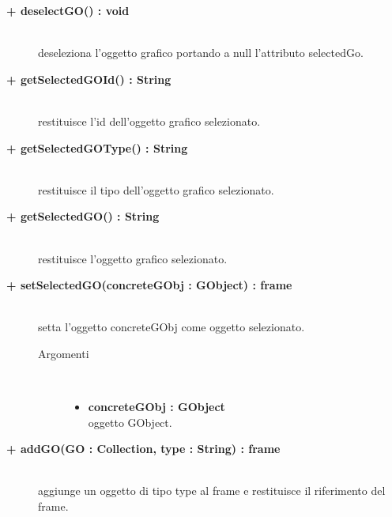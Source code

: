 \begin{description}
\begin{description}
		\item[\textbf{+ deselectGO() : void			}] \hfill \\
			deseleziona l'oggetto grafico portando a null l'attributo selectedGo. 
\end{description}

\begin{description}
		\item[\textbf{+ getSelectedGOId() : String			}] \hfill \\
			restituisce l'id dell'oggetto grafico selezionato.
\end{description}

\begin{description}
		\item[\textbf{+ getSelectedGOType() : String			}] \hfill \\
			restituisce il tipo dell'oggetto grafico selezionato.
\end{description}

\begin{description}
		\item[\textbf{+ getSelectedGO() : String			}] \hfill \\
			restituisce l'oggetto grafico selezionato.
\end{description}

\begin{description}
		\item[\textbf{+ setSelectedGO(concreteGObj : GObject) : frame			}] \hfill \\
			setta l'oggetto concreteGObj come oggetto selezionato.  

\begin{description}
			\item[Argomenti] \hfill \\
				\begin{itemize}
						\item \textbf{concreteGObj : GObject			} \hfill \\
					oggetto GObject.
				\end{itemize}

\end{description}

\end{description}

\begin{description}
		\item[\textbf{+ addGO(GO : Collection, type : String) : frame			}] \hfill \\
			aggiunge un oggetto di tipo type al frame e restituisce il riferimento del frame.  


\end{description}
\end{description}
